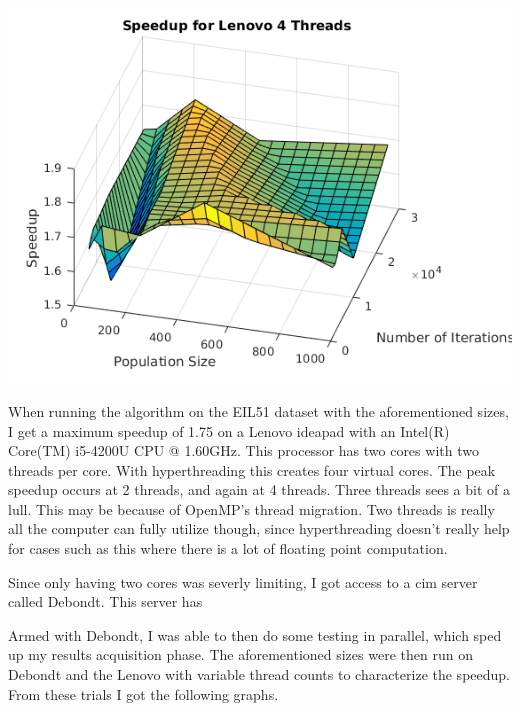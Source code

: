 \documentclass[10pt,letterpaper]{article}
\begin{document}
\includegraphics[scale=1]{../img/Lenovo_4Thread_PopvsIter.png} 

When running the algorithm on the EIL51 dataset with the aforementioned sizes, I get a maximum speedup of 1.75 on a Lenovo ideapad with an Intel(R) Core(TM) i5-4200U CPU @ 1.60GHz. This processor has two cores with two threads per core. With hyperthreading this creates four virtual cores. The peak speedup occurs at 2 threads, and again at 4 threads. Three threads sees a bit of a lull. This may be because of OpenMP's thread migration. Two threads is really all the computer can fully utilize though, since hyperthreading doesn't really help for cases such as this where there is a lot of floating point computation. %

Since only having two cores was severly limiting, I got access to a cim server called Debondt. This server has %

Armed with Debondt, I was able to then do some testing in parallel, which sped up my results acquisition phase. The aforementioned sizes were then run on Debondt and the Lenovo with variable thread counts to characterize the speedup. From these trials I got the following graphs. 
\end{document}

